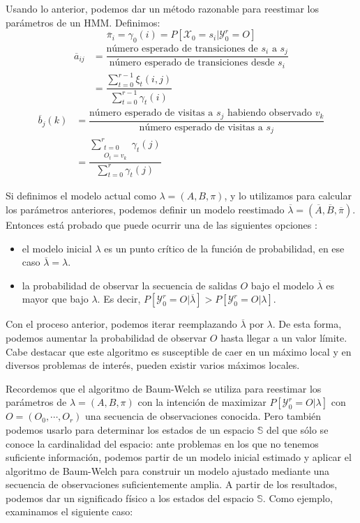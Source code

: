 Usando lo anterior, podemos dar un método razonable para reestimar los parámetros de un HMM. Definimos:
\[\overline{\pi}_i=\gamma_0(i)=P[\mathcal{X}_0=s_i|\mathcal{Y}_0^r=O]\]
\begin{align*}
    \overline{a}_{ij}&=\dfrac{\text{número esperado de transiciones de $s_i$ a $s_j$}}{\text{número esperado de transiciones desde $s_i$}} \\
    &=\dfrac{\displaystyle\sum_{t=0}^{r-1}\xi_t(i,j)}{\displaystyle\sum_{t=0}^{r-1}\gamma_t(i)}
\end{align*}
\begin{align*}
    \overline{b}_j(k)&=\dfrac{\text{número esperado de visitas a $s_j$ habiendo observado $v_k$}}{\text{número esperado de visitas a $s_j$}}\\
    &=\dfrac{\displaystyle\sum_{\substack{t=0 \\ O_t=v_k}}^{r}\gamma_t(j)}{\displaystyle\sum_{t=0}^{r}\gamma_t(j)}
\end{align*}

Si definimos el modelo actual como $\lambda=(A,B,\pi)$, y lo utilizamos para calcular los parámetros anteriores, podemos definir un modelo reestimado $\overline{\lambda}=(\overline{A},\overline{B},\overline{\pi})$. Entonces está probado que puede ocurrir una de las siguientes opciones \cite{Rabiner}:
\begin{itemize}
    \item el modelo inicial $\lambda$ es un punto crítico de la función de probabilidad, en ese caso $\overline{\lambda}=\lambda$.
    \item la probabilidad de observar la secuencia de salidas $O$ bajo el modelo $\overline{\lambda}$ es mayor que bajo $\lambda$. Es decir, $P[\mathcal{Y}_0^r=O|\overline{\lambda}]>P[\mathcal{Y}_0^r=O|\lambda]$.
\end{itemize}

Con el proceso anterior, podemos iterar reemplazando $\overline{\lambda}$ por $\lambda$. De esta forma, podemos aumentar la probabilidad de observar $O$ hasta llegar a un valor límite. Cabe destacar que este algoritmo es susceptible de caer en un máximo local y en diversos problemas de interés, pueden existir varios máximos locales.

Recordemos que el algoritmo de Baum-Welch se utiliza para reestimar los parámetros de $\lambda=(A,B,\pi)$ con la intención de maximizar $P[\mathcal{Y}_0^r=O|\lambda]$ con $O=(O_0,\cdots,O_r)$ una secuencia de observaciones conocida. Pero también podemos usarlo para determinar los estados de un espacio $\mathbb{S}$ del que sólo se conoce la cardinalidad del espacio: ante problemas en los que no tenemos suficiente información, podemos partir de un modelo inicial estimado y aplicar el algoritmo de Baum-Welch para construir un modelo ajustado mediante una secuencia de observaciones suficientemente amplia. A partir de los resultados, podemos dar un significado físico a los estados del espacio $\mathbb{S}$. Como ejemplo, examinamos el siguiente caso: 


